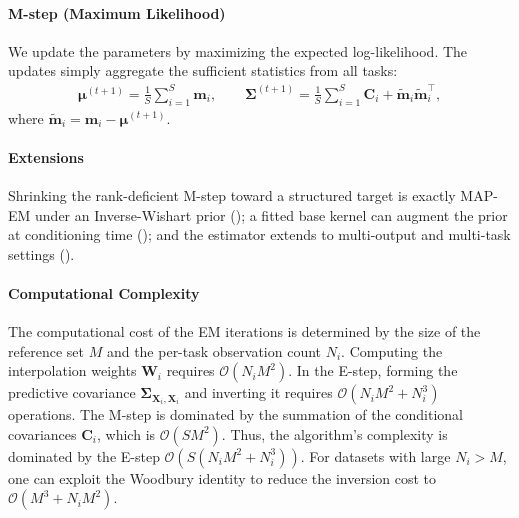 \documentclass{article}
\newcommand{\K}{S}
\newcommand{\IndexSet}{\mathcal{I}}
\newcommand{\bX}{\mathbf{X}}
\begin{document}

\paragraph{M-step (Maximum Likelihood)}
We update the parameters by maximizing the expected log-likelihood. The updates simply aggregate the sufficient statistics from all tasks:
\begin{equation}
\nonumber
    \begin{aligned}
        \boldsymbol{\mu}^{(t+1)} = \frac{1}{\K} \sum_{i=1}^{\K} \mathbf{m}_i, \qquad
        \boldsymbol{\Sigma}^{(t+1)} = \frac{1}{\K} \sum_{i=1}^{\K} \mathbf{C}_i + \mathbf{\tilde m}_i \mathbf{\tilde m}_i^{\!\top},
\end{aligned}
\end{equation}
where $\mathbf{\tilde m}_i = \mathbf{m}_i - \boldsymbol{\mu}^{(t+1)}$.

\paragraph{Extensions}
Shrinking the rank-deficient M-step toward a structured target is exactly MAP-EM under an Inverse-Wishart prior (); a fitted base kernel can augment the prior at conditioning time (); and the estimator extends to multi-output and multi-task settings ().

\paragraph{Computational Complexity}
The computational cost of the EM iterations is determined by the size of the reference set $M$ and the per-task observation count $N_i$.
Computing the interpolation weights $\mathbf{W}_i$ requires $\mathcal{O}(N_i M^2)$.
In the E-step, forming the predictive covariance $\boldsymbol{\Sigma}_{\bX_i, \bX_i}$ and inverting it requires $\mathcal{O}(N_i M^2 + N_i^3)$ operations.
The M-step is dominated by the summation of the conditional covariances $\mathbf{C}_i$, which is $\mathcal{O}(\K M^2)$.
Thus, the algorithm's complexity is dominated by the E-step $\mathcal{O}(\K (N_iM^2 + N_i^3))$. For datasets with large $N_i > M$, one can exploit the Woodbury identity to reduce the inversion cost to $\mathcal{O}(M^3 + N_i M^2)$.
\end{document}
